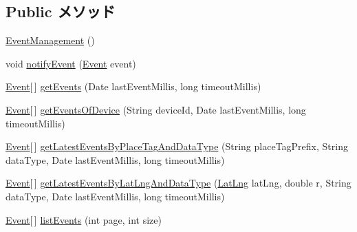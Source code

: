 \subsection*{Public メソッド}
\begin{DoxyCompactItemize}
\item 
\hyperlink{classjp_1_1ac_1_1kyoto__u_1_1i_1_1soc_1_1ai_1_1iostbase_1_1service_1_1_event_management_a8c9377f214ae009b99593b50a61622e7}{Event\-Management} ()
\item 
void \hyperlink{classjp_1_1ac_1_1kyoto__u_1_1i_1_1soc_1_1ai_1_1iostbase_1_1service_1_1_event_management_a8eec8a76c492bbb5d891b2ad842d3753}{notify\-Event} (\hyperlink{classjp_1_1ac_1_1kyoto__u_1_1i_1_1soc_1_1ai_1_1iostbase_1_1service_1_1intf_1_1_event}{Event} event)
\item 
\hyperlink{classjp_1_1ac_1_1kyoto__u_1_1i_1_1soc_1_1ai_1_1iostbase_1_1service_1_1intf_1_1_event}{Event}\mbox{[}$\,$\mbox{]} \hyperlink{classjp_1_1ac_1_1kyoto__u_1_1i_1_1soc_1_1ai_1_1iostbase_1_1service_1_1_event_management_a1d637ad8815fff35b303bc5a84072383}{get\-Events} (Date last\-Event\-Millis, long timeout\-Millis)
\item 
\hyperlink{classjp_1_1ac_1_1kyoto__u_1_1i_1_1soc_1_1ai_1_1iostbase_1_1service_1_1intf_1_1_event}{Event}\mbox{[}$\,$\mbox{]} \hyperlink{classjp_1_1ac_1_1kyoto__u_1_1i_1_1soc_1_1ai_1_1iostbase_1_1service_1_1_event_management_a7513df51d5996fac8a57f6aa089895cd}{get\-Events\-Of\-Device} (String device\-Id, Date last\-Event\-Millis, long timeout\-Millis)
\item 
\hyperlink{classjp_1_1ac_1_1kyoto__u_1_1i_1_1soc_1_1ai_1_1iostbase_1_1service_1_1intf_1_1_event}{Event}\mbox{[}$\,$\mbox{]} \hyperlink{classjp_1_1ac_1_1kyoto__u_1_1i_1_1soc_1_1ai_1_1iostbase_1_1service_1_1_event_management_a1fcaa80b727d7728b76d0dd4deeaaf17}{get\-Latest\-Events\-By\-Place\-Tag\-And\-Data\-Type} (String place\-Tag\-Prefix, String data\-Type, Date last\-Event\-Millis, long timeout\-Millis)
\item 
\hyperlink{classjp_1_1ac_1_1kyoto__u_1_1i_1_1soc_1_1ai_1_1iostbase_1_1service_1_1intf_1_1_event}{Event}\mbox{[}$\,$\mbox{]} \hyperlink{classjp_1_1ac_1_1kyoto__u_1_1i_1_1soc_1_1ai_1_1iostbase_1_1service_1_1_event_management_ababf0fd7241c3cfb1f1009e848eeb594}{get\-Latest\-Events\-By\-Lat\-Lng\-And\-Data\-Type} (\hyperlink{classjp_1_1ac_1_1kyoto__u_1_1i_1_1soc_1_1ai_1_1iostbase_1_1service_1_1intf_1_1_lat_lng}{Lat\-Lng} lat\-Lng, double r, String data\-Type, Date last\-Event\-Millis, long timeout\-Millis)
\item 
\hyperlink{classjp_1_1ac_1_1kyoto__u_1_1i_1_1soc_1_1ai_1_1iostbase_1_1service_1_1intf_1_1_event}{Event}\mbox{[}$\,$\mbox{]} \hyperlink{classjp_1_1ac_1_1kyoto__u_1_1i_1_1soc_1_1ai_1_1iostbase_1_1service_1_1_event_management_a235d15403651c1e09485c24aecf121f8}{list\-Events} (int page, int size)

\end{DoxyCompactItemize}
